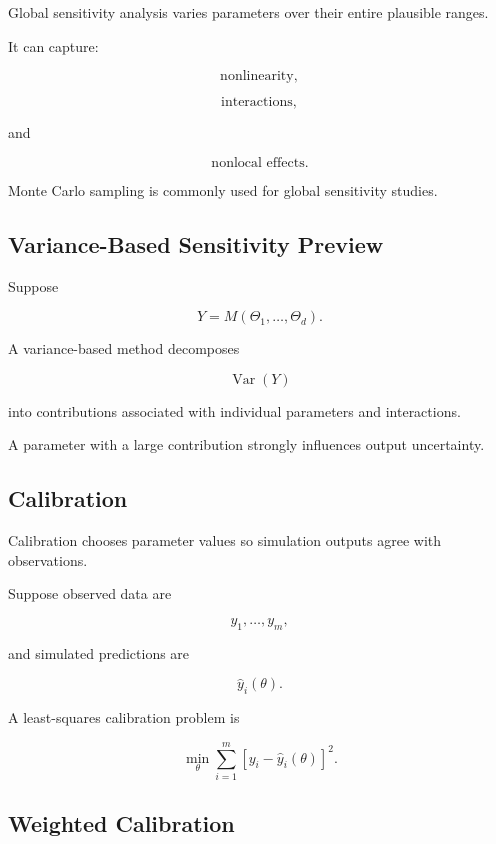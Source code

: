 Global sensitivity analysis varies parameters over their entire plausible
ranges.

It can capture:

\[
\boxed{
\text{nonlinearity},
}
\]

\[
\boxed{
\text{interactions},
}
\]

and

\[
\boxed{
\text{nonlocal effects}.
}
\]

Monte Carlo sampling is commonly used for global sensitivity studies.

\subsection{Variance-Based Sensitivity Preview}
\label{subsec:variance-based-sensitivity-preview}

Suppose

\[
Y=M(\Theta_1,\ldots,\Theta_d).
\]

A variance-based method decomposes

\[
\operatorname{Var}(Y)
\]

into contributions associated with individual parameters and interactions.

A parameter with a large contribution strongly influences output
uncertainty.

\subsection{Calibration}
\label{subsec:simulation-calibration}

Calibration chooses parameter values so simulation outputs agree with
observations.

Suppose observed data are

\[
y_1,\ldots,y_m,
\]

and simulated predictions are

\[
\widehat{y}_i(\theta).
\]

A least-squares calibration problem is

\[
\boxed{
\min_\theta
\sum_{i=1}^{m}
\left[
y_i-\widehat{y}_i(\theta)
\right]^2.
}
\]

\subsection{Weighted Calibration}
\label{subsec:weighted-calibration}

